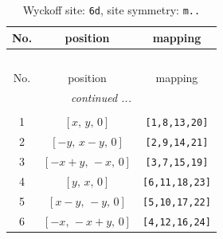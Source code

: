 \documentclass[fleqn,8pt]{jsarticle}
\begin{document}
\renewcommand{\arraystretch}{1.2}
\begin{longtable}{ccc}
\caption{Wyckoff site: {\tt 6d}, site symmetry: {\tt m..}}
 \\
 \hline \hline
No. & position & mapping \\ \hline \endfirsthead

\multicolumn{2}{l}{\tablename\ \thetable{}} \\
 \hline \hline
No. & position & mapping \\ \hline \endhead

 \hline \hline
\multicolumn{2}{r}{\footnotesize\it continued ...} \\ \endfoot

 \hline \hline
\multicolumn{2}{r}{} \\ \endlastfoot

1 & $\left[ x,\, y,\, 0 \right]$ & {\tt [1,8,13,20]} \\ \hline
2 & $\left[ - y,\, x - y,\, 0 \right]$ & {\tt [2,9,14,21]} \\ \hline
3 & $\left[ - x + y,\, - x,\, 0 \right]$ & {\tt [3,7,15,19]} \\ \hline
4 & $\left[ y,\, x,\, 0 \right]$ & {\tt [6,11,18,23]} \\ \hline
5 & $\left[ x - y,\, - y,\, 0 \right]$ & {\tt [5,10,17,22]} \\ \hline
6 & $\left[ - x,\, - x + y,\, 0 \right]$ & {\tt [4,12,16,24]} \\
\end{longtable}
\renewcommand{\arraystretch}{1.2}
\end{document}
